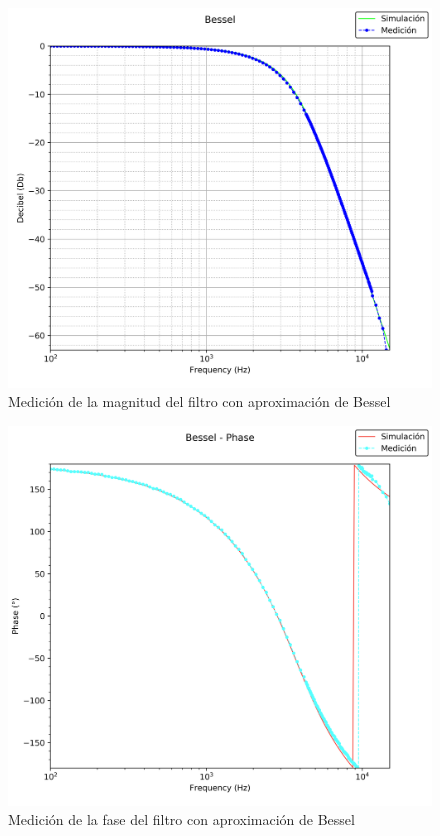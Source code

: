 \begin{figure}[H]
	\centering
	\includegraphics[scale=0.5,keepaspectratio]{../Ex1/Informe/BodeBesselMagnitud.png}
	\caption{Medición de la magnitud del filtro con aproximación de Bessel}
	\label{fig:medicionbesselmagnitud}
\end{figure}

\begin{figure}[H]
	\centering
	\includegraphics[scale=0.5,keepaspectratio]{../Ex1/Informe/BodeBesselFase.png}
	\caption{Medición de la fase del filtro con aproximación de Bessel}
	\label{fig:medicionbesselfase}
\end{figure}

